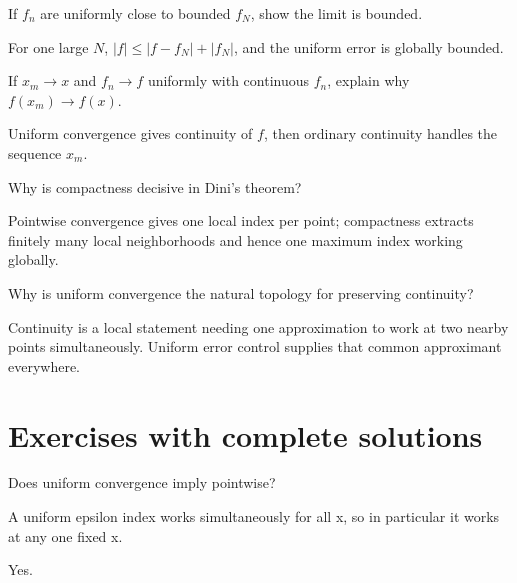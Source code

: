 \begin{problem}\label{prob:ii11-problem-09}
If $f_n$ are uniformly close to bounded $f_N$, show the limit is bounded.
\end{problem}
\begin{solution}
For one large $N$, $|f|\le|f-f_N|+|f_N|$, and the uniform error is globally bounded.
\end{solution}

\begin{problem}\label{prob:ii11-problem-10}
If $x_m\to x$ and $f_n\to f$ uniformly with continuous $f_n$, explain why $f(x_m)\to f(x)$.
\end{problem}
\begin{solution}
Uniform convergence gives continuity of $f$, then ordinary continuity handles the sequence $x_m$.
\end{solution}

\begin{problem}\label{prob:ii11-problem-11}
Why is compactness decisive in Dini's theorem?
\end{problem}
\begin{solution}
Pointwise convergence gives one local index per point; compactness extracts finitely many local neighborhoods and hence one maximum index working globally.
\end{solution}

\begin{problem}\label{prob:ii11-problem-12}
Why is uniform convergence the natural topology for preserving continuity?
\end{problem}
\begin{solution}
Continuity is a local statement needing one approximation to work at two nearby points simultaneously. Uniform error control supplies that common approximant everywhere.
\end{solution}

\section{Exercises with complete solutions}

\begin{exercise}\label{exr:ii11-01}
Does uniform convergence imply pointwise?
\end{exercise}
\begin{hint}
A uniform epsilon index works simultaneously for all x, so in particular it works at any one fixed x.
\end{hint}
\begin{solution}
Yes.
\end{solution}

